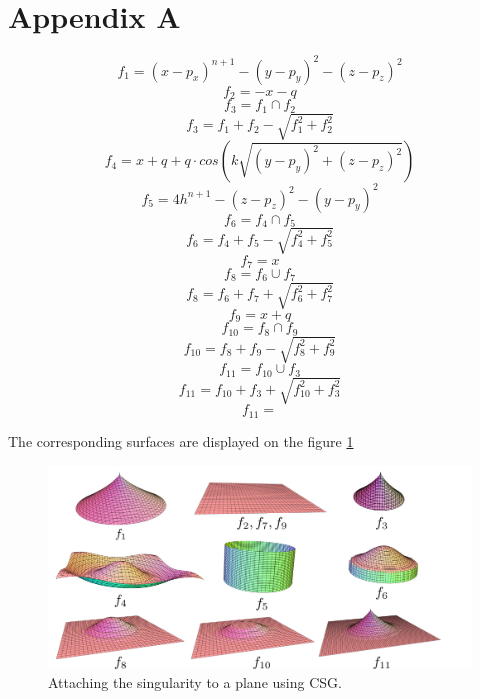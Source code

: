 \chapter*{Appendix A}
\label{appA}

$$f_1 = (x - p_x)^{n+1} - (y - p_y)^2 - (z - p_z)^2$$
$$f_2 = - x - q$$
$$f_3 = f_1 \cap f_2$$
$$f_3 = f_1+f_2-\sqrt{f_1^2+f_2^2}$$
$$f_4 = x + q + q \cdot cos\left(k \sqrt{(y - p_y)^2 + (z - p_z)^2}\right)$$
$$f_5 = 4 h^{n+1} - (z - p_z)^2 - (y - p_y)^2$$
$$f_6 = f_4 \cap f_5$$
$$f_6 = f_4+f_5-\sqrt{f_4^2+f_5^2}$$
$$f_7 = x$$
$$f_8 = f_6 \cup f_7$$
$$f_8 = f_6 + f_7 + \sqrt{f_6^2+f_7^2}$$
$$f_9 = x+q$$
$$f_{10} = f_8 \cap f_9$$
$$f_{10} = f_8 + f_9 - \sqrt{f_8^2+f_9^2}$$
$$f_{11} = f_{10} \cup f_3$$
$$f_{11} = f_{10} + f_3 + \sqrt{f_{10}^2+f_3^2}$$
$$f_{11} = $$

The corresponding surfaces are displayed on the figure \ref{img:27}
\begin{figure}
    \centerline{\includegraphics[scale=0.5]{images/img27}}
    \caption[Attaching the singularity to a plane using CSG]
    {Attaching the singularity to a plane using CSG.}
    \label{img:27}
\end{figure}

